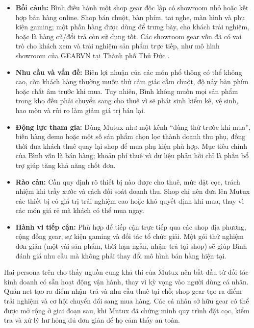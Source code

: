 \begin{itemize}
    \item \textbf{Bối cảnh:} Bình điều hành một shop gear độc lập có showroom nhỏ hoặc kết hợp bán hàng online. Shop bán chuột, bàn phím, tai nghe, màn hình và phụ kiện gaming; một phần hàng được dùng để trưng bày, cho khách trải nghiệm, hoặc là hàng cũ/đổi trả còn sử dụng tốt. Các showroom gear vốn đã có vai trò cho khách xem và trải nghiệm sản phẩm trực tiếp, như mô hình showroom của GEARVN tại Thành phố Thủ Đức \cite{gearvnShowroom}.
    \item \textbf{Nhu cầu và vấn đề:} Biên lợi nhuận của các món phổ thông có thể không cao, còn khách hàng thường muốn thử cảm giác cầm chuột, độ nảy bàn phím hoặc chất âm trước khi mua. Tuy nhiên, Bình không muốn mọi sản phẩm trong kho đều phải chuyển sang cho thuê vì sẽ phát sinh kiểm kê, vệ sinh, hao mòn và rủi ro làm giảm giá trị bán lại.
    \item \textbf{Động lực tham gia:} Dùng Mutux như một kênh ``dùng thử trước khi mua'', biến hàng demo hoặc một số sản phẩm chọn lọc thành doanh thu phụ, đồng thời đưa khách thuê quay lại shop để mua phụ kiện phù hợp. Mục tiêu chính của Bình vẫn là bán hàng; khoản phí thuê và dữ liệu phản hồi chỉ là phần bổ trợ giúp tăng khả năng chốt đơn.
    \item \textbf{Rào cản:} Cần quy định rõ thiết bị nào được cho thuê, mức đặt cọc, trách nhiệm khi trầy xước và cách đối soát doanh thu. Shop chỉ nên đưa lên Mutux các thiết bị có giá trị trải nghiệm cao hoặc khó quyết định khi mua, thay vì các món giá rẻ mà khách có thể mua ngay.
    \item \textbf{Hành vi tiếp cận:} Phù hợp để tiếp cận trực tiếp qua các shop địa phương, cộng đồng gear, sự kiện gaming và đối tác tổ chức giải. Một gói thử nghiệm đơn giản (một vài sản phẩm, thời hạn ngắn, nhận--trả tại shop) sẽ giúp Bình đánh giá nhu cầu mà không phải thay đổi mô hình bán hàng hiện tại.
\end{itemize}


Hai persona trên cho thấy nguồn cung khả thi của Mutux nên bắt đầu từ đối tác kinh doanh có sẵn hoạt động vận hành, thay vì kỳ vọng vào người dùng cá nhân. Quán net tạo ra điểm nhận--trả và nhu cầu thuê tại chỗ; shop gear tạo ra điểm trải nghiệm và cơ hội chuyển đổi sang mua hàng. Các cá nhân sở hữu gear có thể được mở rộng ở giai đoạn sau, khi Mutux đã chứng minh quy trình đặt cọc, kiểm tra và xử lý hư hỏng đủ đơn giản để họ cảm thấy an toàn.


